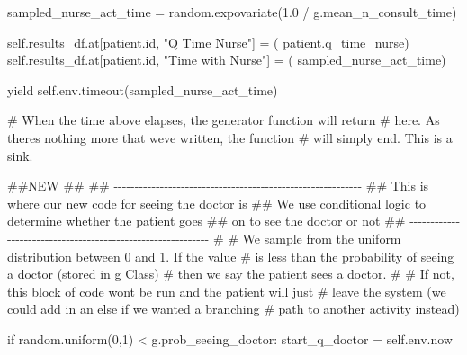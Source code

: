 \documentclass[
  letterpaper,
  DIV=11,
  numbers=noendperiod]{scrreprt}
\newenvironment{Shaded}{}{}
\newcommand{\BuiltInTok}[1]{\textcolor[rgb]{0.84,0.23,0.29}{#1}}
\newcommand{\CommentTok}[1]{\textcolor[rgb]{0.42,0.45,0.49}{#1}}
\newcommand{\ControlFlowTok}[1]{\textcolor[rgb]{0.84,0.23,0.29}{#1}}
\newcommand{\DecValTok}[1]{\textcolor[rgb]{0.00,0.36,0.77}{#1}}
\newcommand{\FloatTok}[1]{\textcolor[rgb]{0.00,0.36,0.77}{#1}}
\newcommand{\NormalTok}[1]{\textcolor[rgb]{0.14,0.16,0.18}{#1}}
\newcommand{\OperatorTok}[1]{\textcolor[rgb]{0.14,0.16,0.18}{#1}}
\newcommand{\StringTok}[1]{\textcolor[rgb]{0.01,0.18,0.38}{#1}}
\newcommand{\VariableTok}[1]{\textcolor[rgb]{0.89,0.38,0.04}{#1}}
\begin{document}
\begin{Shaded}
\begin{Highlighting}[]
\NormalTok{            sampled\_nurse\_act\_time }\OperatorTok{=}\NormalTok{ random.expovariate(}\FloatTok{1.0} \OperatorTok{/}
\NormalTok{                                                        g.mean\_n\_consult\_time)}

            \VariableTok{self}\NormalTok{.results\_df.at[patient.}\BuiltInTok{id}\NormalTok{, }\StringTok{"Q Time Nurse"}\NormalTok{] }\OperatorTok{=}\NormalTok{ (}
\NormalTok{                patient.q\_time\_nurse)}
            \VariableTok{self}\NormalTok{.results\_df.at[patient.}\BuiltInTok{id}\NormalTok{, }\StringTok{"Time with Nurse"}\NormalTok{] }\OperatorTok{=}\NormalTok{ (}
\NormalTok{                sampled\_nurse\_act\_time)}

            \ControlFlowTok{yield} \VariableTok{self}\NormalTok{.env.timeout(sampled\_nurse\_act\_time)}

            \CommentTok{\# When the time above elapses, the generator function will return}
            \CommentTok{\# here.  As there\textquotesingle{}s nothing more that we\textquotesingle{}ve written, the function}
            \CommentTok{\# will simply end.  This is a sink.}

        \CommentTok{\#\#NEW}
        \CommentTok{\#\#}
        \CommentTok{\#\# {-}{-}{-}{-}{-}{-}{-}{-}{-}{-}{-}{-}{-}{-}{-}{-}{-}{-}{-}{-}{-}{-}{-}{-}{-}{-}{-}{-}{-}{-}{-}{-}{-}{-}{-}{-}{-}{-}{-}{-}{-}{-}{-}{-}{-}{-}{-}{-}{-}{-}{-}{-}{-}{-}{-}{-}{-}{-}{-}}
        \CommentTok{\#\# This is where our new code for seeing the doctor is}
        \CommentTok{\#\# We use conditional logic to determine whether the patient goes}
        \CommentTok{\#\# on to see the doctor or not}
        \CommentTok{\#\# {-}{-}{-}{-}{-}{-}{-}{-}{-}{-}{-}{-}{-}{-}{-}{-}{-}{-}{-}{-}{-}{-}{-}{-}{-}{-}{-}{-}{-}{-}{-}{-}{-}{-}{-}{-}{-}{-}{-}{-}{-}{-}{-}{-}{-}{-}{-}{-}{-}{-}{-}{-}{-}{-}{-}{-}{-}{-}{-}{-}}
        \CommentTok{\#}
        \CommentTok{\# We sample from the uniform distribution between 0 and 1.  If the value}
        \CommentTok{\# is less than the probability of seeing a doctor (stored in g Class)}
        \CommentTok{\# then we say the patient sees a doctor.}
        \CommentTok{\#}
        \CommentTok{\# If not, this block of code won\textquotesingle{}t be run and the patient will just}
        \CommentTok{\# leave the system (we could add in an else if we wanted a branching}
        \CommentTok{\# path to another activity instead)}

        \ControlFlowTok{if}\NormalTok{ random.uniform(}\DecValTok{0}\NormalTok{,}\DecValTok{1}\NormalTok{) }\OperatorTok{\textless{}}\NormalTok{ g.prob\_seeing\_doctor:}
\NormalTok{            start\_q\_doctor }\OperatorTok{=} \VariableTok{self}\NormalTok{.env.now}


\end{Highlighting}
\end{Shaded}
\end{document}
